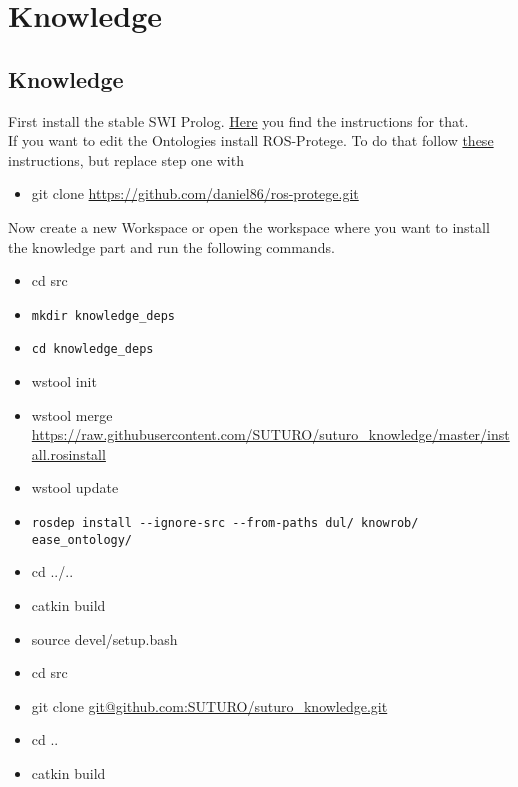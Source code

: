 \documentclass[main.tex]{subfiles}
\begin{document}
\section{Knowledge}
\subsection{Knowledge}
First install the stable SWI Prolog. \href{https://www.swi-prolog.org/build/PPA.html}{Here} you find the instructions for that.\\
If you want to edit the Ontologies install ROS-Protege. To do that follow \href{https://github.com/protegeproject/protege/wiki/Building-from-Source}{these} instructions, but replace step one with
\begin{itemize}
\item git clone \url{https://github.com/daniel86/ros-protege.git} 
\end{itemize}

Now create a new Workspace or open the workspace where you want to install the knowledge part and run the following commands.
\begin{itemize}
\item cd src
\item \begin{verbatim}mkdir knowledge_deps\end{verbatim}
\item \begin{verbatim}cd knowledge_deps\end{verbatim}
\item wstool init
\item wstool merge \url{https://raw.githubusercontent.com/SUTURO/suturo_knowledge/master/install.rosinstall}
\item wstool update
\item \begin{verbatim}rosdep install --ignore-src --from-paths dul/ knowrob/ ease_ontology/\end{verbatim}
\item cd ../..
\item catkin build
\item source devel/setup.bash
\item cd src
\item git clone \url{git@github.com:SUTURO/suturo_knowledge.git}
\item cd ..
\item catkin build  
\end{itemize}
\end{document}
